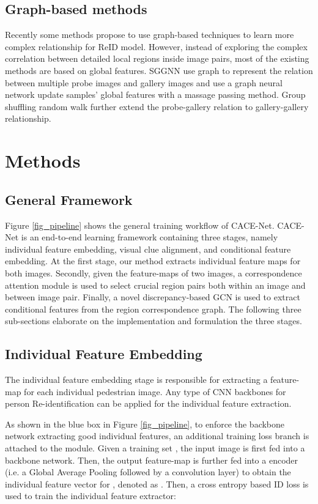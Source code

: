 \documentclass[final]{cvpr}
\begin{document}
\subsection{Graph-based methods}
Recently some methods propose to use graph-based techniques to learn more complex relationship for ReID model. However, instead of exploring the complex correlation between detailed local regions inside image pairs, most of the existing methods are based on global features. SGGNN \cite{shen2018deep} use graph to represent the relation between multiple probe images and gallery images and use a graph neural network update samples' global features with a massage passing method. Group shuffling random walk \cite{shen2018person} further extend the probe-gallery relation to gallery-gallery relationship. 

\section{Methods}
\subsection{General Framework}
Figure \ref{fig_pipeline} shows the general training workflow of CACE-Net. CACE-Net is an end-to-end learning framework containing three stages, namely individual feature embedding, visual clue alignment, and conditional feature embedding. 
At the first stage, our method extracts individual feature maps for both images. Secondly, given the feature-maps of two images, a correspondence attention module is used to select crucial region pairs both within an image and between image pair. Finally, a novel discrepancy-based GCN is used to extract conditional features from the region correspondence graph. 
The following three sub-sections elaborate on the implementation and formulation the three stages. 




\subsection{Individual Feature Embedding}

The individual feature embedding stage is responsible for extracting a feature-map for each individual pedestrian image. Any type of CNN backbones for person Re-identification can be applied for the individual feature extraction. 

As shown in the blue box in Figure \ref{fig_pipeline}, to enforce the backbone network extracting good individual features, an additional training loss branch is attached to the module. 
Given a training set , the input image  is first fed into a backbone network. Then, the output feature-map is further fed into a encoder (i.e. a Global Average Pooling followed by a  convolution layer) to obtain the individual feature vector for , denoted as . Then, a cross entropy based ID loss is used to train the individual feature extractor:
\end{document}
